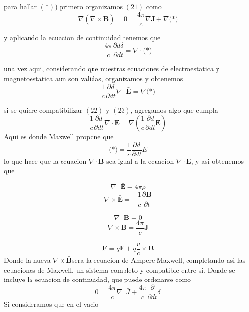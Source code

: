\documentclass{article}
\begin{document}
	para hallar \((*)\)) primero organizamos \((21)\) como
	\begin{equation*}
		\nabla(\nabla\times\mathbf{\bar{B}})=0=\frac{4\pi}{c} \nabla \mathbf{\bar{J}} + \nabla\text{(*)}
	\end{equation*}
	
	
	y aplicando la ecuacion de continuidad tenemos que
	\begin{equation}
		\frac{4\pi}{c} \frac{\partial d\delta}{\partial dt} = \nabla\cdot\text{(*)} 
	\end{equation}
	
	una vez aqui, considerando que nuestras ecuaciones de electroestatica y magnetoestatica aun son validas, organizamos y obtenemos
	\begin{equation}
		\frac{1}{c} \frac{\partial d}{\partial dt}\nabla \cdot \mathbf{\bar{E}}=\nabla \text{(*)}
	\end{equation}
	
	si se quiere compatibilizar \((22)\) y \((23)\), agregamos algo que cumpla
	\begin{equation*}
		\frac{1}{c}\frac{\partial d}{\partial dt}\nabla\cdot\mathbf{\bar{E}}=\nabla(\frac{1}{c}\frac{\partial d}{\partial dt}\mathbf{\bar{E}})
	\end{equation*}
	Aqui es donde Maxwell propone que
	\begin{equation*}
		\text{(*)}=\frac{1}{c}\frac{\partial d}{\partial dt}\bar{E}
	\end{equation*}
	lo que hace que la ecuacion  \(\nabla \cdot \mathbf{B}\) sea igual a la ecuacion \(\nabla \cdot \mathbf{E}\), y asi obtenemos que
	\begin{minipage}{.5\textwidth}
		\begin{equation*}
			\nabla \cdot \mathbf{\bar{E}} = 4 \pi \rho
		\end{equation*}
		\begin{equation*}
			\nabla \times \mathbf{\bar{E}} = -\frac{1}{c} \frac{\partial \mathbf{\bar{B}}}{\partial t}
		\end{equation*}
	\end{minipage}   
	\begin{minipage}{.5\textwidth}
		\begin{equation}
			\nabla \cdot \mathbf{\bar{B}} = 0
		\end{equation}
		\begin{equation}
			\nabla \times \mathbf{\bar{B}} = \frac{4\pi}{c} \mathbf{\bar{J}}
		\end{equation}
	\end{minipage}
	\[
	\mathbf{\bar{F}} = q\mathbf{\bar{E}} + q\frac{\bar{v}}{c} \times \mathbf{\bar{B}}
	\]
	Donde la nueva \(\nabla \times \mathbf{\bar{B}}\)sera la ecuacion de Ampere-Maxwell, completando asi las ecuaciones de Maxwell, un sistema completo y compatible entre si.
	Donde se incluye la ecuacion de continuidad, que puede ordenarse como
	\begin{equation}
		0=\frac{4\pi}{c}\nabla\cdot\bar{J}+\frac{4\pi}{c}\frac{\partial}{\partial dt}\delta
	\end{equation}
	Si consideramos que en el vacio
	
\end{document}
